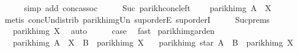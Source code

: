 \begin{isabellebody}
\ \ \ \ \isamarkupfalse%
\ {\isacharparenleft}{\kern0pt}simp\ add{\isacharcolon}{\kern0pt}\ conc{\isacharunderscore}{\kern0pt}assoc{\isacharparenright}{\kern0pt}\isanewline
\ \ \isamarkupfalse%
\ \isamarkupfalse%
\ Suc\ parikh{\isacharunderscore}{\kern0pt}conc{\isacharunderscore}{\kern0pt}left\ \isamarkupfalse%
\ {\isachardoublequoteopen}{\isasymdots}\ {\isasymsubseteq}\ parikh{\isacharunderscore}{\kern0pt}img\ {\isacharparenleft}{\kern0pt}A\ {\isacharat}{\kern0pt}{\isacharat}{\kern0pt}\ X{\isacharparenright}{\kern0pt}{\isachardoublequoteclose}\isanewline
\ \ \ \ \isamarkupfalse%
\ {\isacharparenleft}{\kern0pt}metis\ conc{\isacharunderscore}{\kern0pt}Un{\isacharunderscore}{\kern0pt}distrib{\isacharparenleft}{\kern0pt}{}{\isacharparenright}{\kern0pt}\ parikh{\isacharunderscore}{\kern0pt}img{\isacharunderscore}{\kern0pt}Un\ sup{\isachardot}{\kern0pt}orderE\ sup{\isachardot}{\kern0pt}orderI{\isacharparenright}{\kern0pt}\isanewline
\ \ \isamarkupfalse%
\ \isamarkupfalse%
\ Suc{\isachardot}{\kern0pt}prems\ \isamarkupfalse%
\ {\isachardoublequoteopen}{\isasymdots}\ {\isasymsubseteq}\ parikh{\isacharunderscore}{\kern0pt}img\ X{\isachardoublequoteclose}\ \isamarkupfalse%
\ auto\isanewline
\ \ \isamarkupfalse%
\ \isamarkupfalse%
\ {\isacharquery}{\kern0pt}case\ \isamarkupfalse%
\ fast\isanewline
{}\isamarkupfalse%
%
\endisatagproof
{\isafoldproof}%
%
\isadelimproof
\isanewline
%
\endisadelimproof
\isanewline
{}\isamarkupfalse%
\ parikh{\isacharunderscore}{\kern0pt}img{\isacharunderscore}{\kern0pt}arden{\isacharcolon}{\kern0pt}\isanewline
\ \ \ {\isachardoublequoteopen}parikh{\isacharunderscore}{\kern0pt}img\ {\isacharparenleft}{\kern0pt}A\ {\isacharat}{\kern0pt}{\isacharat}{\kern0pt}\ X\ {\isasymunion}\ B{\isacharparenright}{\kern0pt}\ {\isasymsubseteq}\ parikh{\isacharunderscore}{\kern0pt}img\ X{\isachardoublequoteclose}\isanewline
\ \ \ {\isachardoublequoteopen}parikh{\isacharunderscore}{\kern0pt}img\ {\isacharparenleft}{\kern0pt}star\ A\ {\isacharat}{\kern0pt}{\isacharat}{\kern0pt}\ B{\isacharparenright}{\kern0pt}\ {\isasymsubseteq}\ parikh{\isacharunderscore}{\kern0pt}img\ X{\isachardoublequoteclose}\isanewline
%
\isadelimproof
%
\endisadelimproof
%
\isatagproof
{}\isamarkupfalse%
\isanewline
\ \ \isamarkupfalse%

\end{isabellebody}

